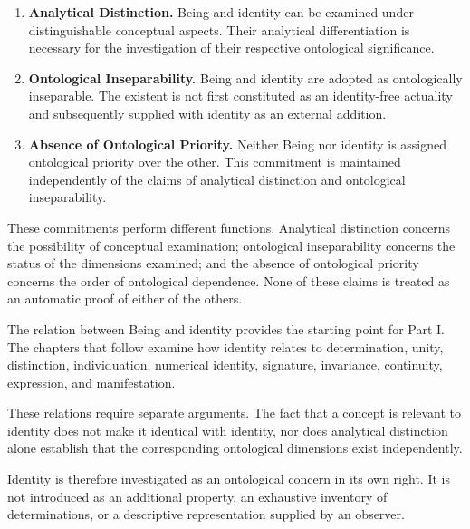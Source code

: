 \begin{enumerate}

    \item \textbf{Analytical Distinction.}
    Being and identity can be examined under
    distinguishable conceptual aspects. Their
    analytical differentiation is necessary
    for the investigation of their respective
    ontological significance.

    \item \textbf{Ontological Inseparability.}
    Being and identity are adopted as
    ontologically inseparable. The existent
    is not first constituted as an identity-free
    actuality and subsequently supplied with
    identity as an external addition.

    \item \textbf{Absence of Ontological Priority.}
    Neither Being nor identity is assigned
    ontological priority over the other.
    This commitment is maintained independently
    of the claims of analytical distinction
    and ontological inseparability.

\end{enumerate}

These commitments perform different functions.
Analytical distinction concerns the possibility
of conceptual examination; ontological inseparability
concerns the status of the dimensions examined;
and the absence of ontological priority concerns
the order of ontological dependence. None of
these claims is treated as an automatic proof
of either of the others.

The relation between Being and identity provides
the starting point for Part I. The chapters
that follow examine how identity relates to
determination, unity, distinction, individuation,
numerical identity, signature, invariance,
continuity, expression, and manifestation.

These relations require separate arguments.
The fact that a concept is relevant to identity
does not make it identical with identity, nor
does analytical distinction alone establish
that the corresponding ontological dimensions
exist independently.

Identity is therefore investigated as an
ontological concern in its own right. It is
not introduced as an additional property,
an exhaustive inventory of determinations,
or a descriptive representation supplied
by an observer.



